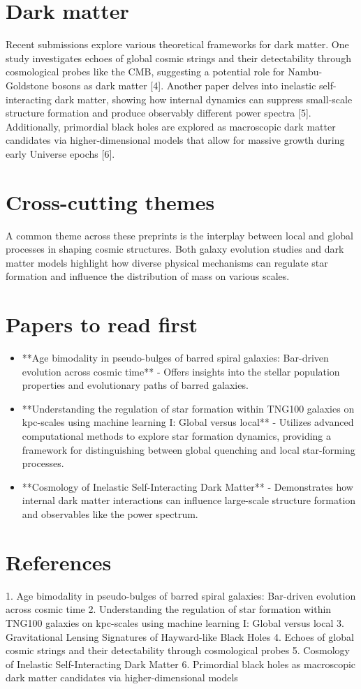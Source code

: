 \documentclass[11pt]{article}
\begin{document}
\section*{Dark matter}
Recent submissions explore various theoretical frameworks for dark matter. One study investigates echoes of global cosmic strings and their detectability through cosmological probes like the CMB, suggesting a potential role for Nambu-Goldstone bosons as dark matter [4]. Another paper delves into inelastic self-interacting dark matter, showing how internal dynamics can suppress small-scale structure formation and produce observably different power spectra [5]. Additionally, primordial black holes are explored as macroscopic dark matter candidates via higher-dimensional models that allow for massive growth during early Universe epochs [6].
\section*{Cross-cutting themes}
A common theme across these preprints is the interplay between local and global processes in shaping cosmic structures. Both galaxy evolution studies and dark matter models highlight how diverse physical mechanisms can regulate star formation and influence the distribution of mass on various scales.
\section*{Papers to read first}
\begin{itemize}
\item **Age bimodality in pseudo-bulges of barred spiral galaxies: Bar-driven evolution across cosmic time** - Offers insights into the stellar population properties and evolutionary paths of barred galaxies.
\item **Understanding the regulation of star formation within TNG100 galaxies on kpc-scales using machine learning I: Global versus local** - Utilizes advanced computational methods to explore star formation dynamics, providing a framework for distinguishing between global quenching and local star-forming processes.
\item **Cosmology of Inelastic Self-Interacting Dark Matter** - Demonstrates how internal dark matter interactions can influence large-scale structure formation and observables like the power spectrum.
\end{itemize}
\section*{References}
1. Age bimodality in pseudo-bulges of barred spiral galaxies: Bar-driven evolution across cosmic time
2. Understanding the regulation of star formation within TNG100 galaxies on kpc-scales using machine learning I: Global versus local
3. Gravitational Lensing Signatures of Hayward-like Black Holes
4. Echoes of global cosmic strings and their detectability through cosmological probes
5. Cosmology of Inelastic Self-Interacting Dark Matter
6. Primordial black holes as macroscopic dark matter candidates via higher-dimensional models
\newpage
\end{document}
